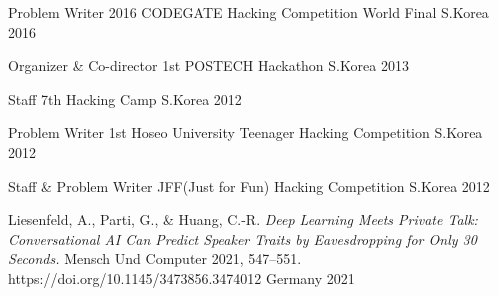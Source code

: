 

\begin{cvhonors}

  \cvhonor
    {Problem Writer} %
    {2016 CODEGATE Hacking Competition World Final} %
    {S.Korea} %
    {2016} %

  \cvhonor
    {Organizer \& Co-director} %
    {1st POSTECH Hackathon} %
    {S.Korea} %
    {2013} %

  \cvhonor
    {Staff} %
    {7th Hacking Camp} %
    {S.Korea} %
    {2012} %

  \cvhonor
    {Problem Writer} %
    {1st Hoseo University Teenager Hacking Competition} %
    {S.Korea} %
    {2012} %

  \cvhonor
    {Staff \& Problem Writer} %
    {JFF(Just for Fun) Hacking Competition} %
    {S.Korea} %
    {2012} %

  \cvhonor
    {Liesenfeld, A., Parti, G., \& Huang, C.-R.} %
    {\textit{Deep Learning Meets Private Talk: Conversational AI Can Predict Speaker Traits by Eavesdropping for Only 30 Seconds.} Mensch Und Computer 2021, 547–551. https://doi.org/10.1145/3473856.3474012} %
    {Germany} %
    {2021} %






\end{cvhonors}
